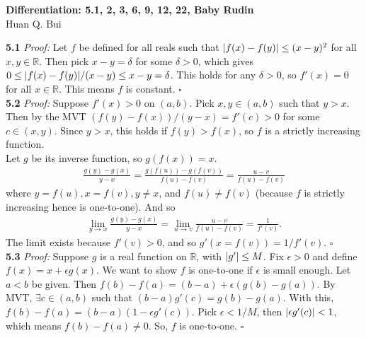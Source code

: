 \documentclass[11pt]{article}
\begin{document}
\begin{center}
{\Large\bf  Differentiation:  5.1, 2, 3, 6, 9, 12, 22, Baby Rudin}\\
$\,$\\
{\Large  Huan Q. Bui}
\end{center}




\noindent \textbf{5.1}
\noindent \textit{Proof:}  Let $f$ be defined for all reals such that $\abs{f(x) - f(y)} \leq (x-y)^2$ for all $x,y \in \mathbb{R}$. Then pick $x - y =\delta$ for some $\delta > 0$,  which gives $0 \leq \abs{f(x) - f(y)}/(x-y) \leq x-y = \delta$.  This holds for any $\delta > 0$, so $f'(x) = 0$ for all $x \in \mathbb{R}$. This means $f$ is constant. \hfill $\square$\\


\noindent \textbf{5.2}
\noindent \textit{Proof:} Suppose $f'(x) > 0$ on $(a,b)$. Pick $x,y \in (a,b)$ such that $y > x$. Then by the MVT $(f(y) - f(x)) / (y-x) = f'(c) > 0$ for some $c \in (x,y)$. Since $y>x$, this holds if $f(y) > f(x)$, so $f$ is a strictly increasing function.\\

\noindent Let $g$ be its inverse function, so $g(f(x)) = x$. 
\begin{align*}
\frac{g(y) - g(x)}{y-x} = \frac{g(f(u)) - g(f(v))}{f(u) - f(v)} = \frac{u-v}{f(u) - f(v)}
\end{align*} 
where $y = f(u), x = f(v), y\neq x$, and $f(u) \neq f(v)$ (because $f$ is strictly increasing hence is one-to-one). And so
\begin{align}
\lim_{y\to x} \frac{g(y) - g(x)}{y-x} = \lim_{u\to v}\frac{u-v}{f(u) - f(v)} = \frac{1}{f'(v)}.
\end{align}
The limit exists because $f'(v) > 0$, and so $g'(x = f(v)) = 1/f'(v)$.   \hfill $\square$\\ 





\noindent \textbf{5.3}
\noindent \textit{Proof:}  Suppose $g$ is a real function on $\mathbb{R}$, with $\abs{g'} \leq M$. Fix $\epsilon >0$ and define $f(x) = x + \epsilon g(x) $. We want to show $f$ is one-to-one if $\epsilon$ is small enough. Let $a< b$ be given. Then $f(b) - f(a) = (b-a) + \epsilon (g(b) - g(a))$. By MVT, $\exists c \in (a,b)$ such that $(b-a)g'(c) = g(b) - g(a)$. With this, $f(b) - f(a) = (b-a)(1 - \epsilon g'(c))$. Pick $\epsilon < 1/M$, then $\abs{\epsilon g'(c)} < 1$, which means $f(b) - f(a) \neq 0$. So, $f$ is one-to-one. \hfill $\square$\\
\end{document}
